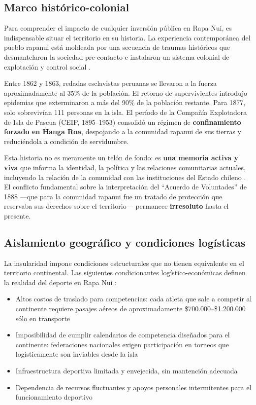 \documentclass[12pt, a4paper]{article}
\begin{document}
\subsection{Marco histórico-colonial}

Para comprender el impacto de cualquier inversión pública en Rapa Nui, es
indispensable situar el territorio en su historia. La experiencia contemporánea del
pueblo rapanui está moldeada por una secuencia de traumas históricos que
desmantelaron la sociedad pre-contacto e instalaron un sistema colonial de
explotación y control social \citep{cristino2011}.

Entre 1862 y 1863, redadas esclavistas peruanas se llevaron a la fuerza aproximadamente
al 35\% de la población. El retorno de supervivientes introdujo epidemias que exterminaron
a más del 90\% de la población restante. Para 1877, solo sobrevivían 111 personas en
la isla. El período de la Compañía Explotadora de Isla de Pascua (CEIP, 1895--1953)
consolidó un régimen de \textbf{confinamiento forzado en Hanga Roa}, despojando a la
comunidad rapanui de sus tierras y reduciéndola a condición de servidumbre.

Esta historia no es meramente un telón de fondo: es \textbf{una memoria activa y
viva} que informa la identidad, la política y las relaciones comunitarias actuales,
incluyendo la relación de la comunidad con las instituciones del Estado chileno
\citep{foerster2021}. El conflicto fundamental sobre la interpretación del ``Acuerdo
de Voluntades'' de 1888 ---que para la comunidad rapanui fue un tratado de protección
que reservaba sus derechos sobre el territorio--- permanece \textbf{irresoluto} hasta
el presente.

\subsection{Aislamiento geográfico y condiciones logísticas}

La insularidad impone condiciones estructurales que no tienen equivalente en el
territorio continental. Las siguientes condicionantes logístico-económicas
definen la realidad del deporte en Rapa Nui \citep{ortega2026}:

\begin{itemize}[leftmargin=*, itemsep=4pt]
  \item Altos costos de traslado para competencias: cada atleta que sale a competir
        al continente requiere pasajes aéreos de aproximadamente \$700.000--\$1.200.000
        sólo en transporte
  \item Imposibilidad de cumplir calendarios de competencia diseñados para el
        continente: federaciones nacionales exigen participación en torneos que
        logísticamente son inviables desde la isla
  \item Infraestructura deportiva limitada y envejecida, sin mantención adecuada
  \item Dependencia de recursos fluctuantes y apoyos personales intermitentes
        para el funcionamiento deportivo
\end{itemize}
\end{document}
